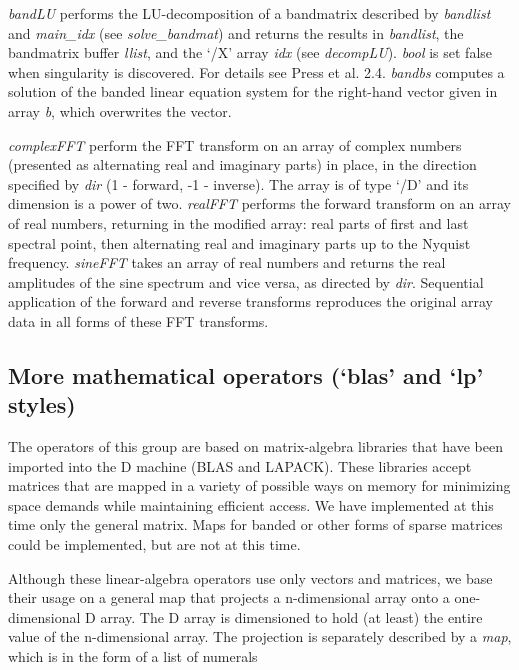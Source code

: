 \emph{bandLU} performs the LU-decomposition of a bandmatrix described by \emph{bandlist} and \emph{main\_idx} (see \emph{solve\_bandmat}) and returns the results in \emph{bandlist}, the bandmatrix buffer \emph{llist}, and the `/X' array \emph{idx} (see \emph{decompLU}). \emph{bool} is set false when singularity is discovered. For details see Press et al. 2.4. \emph{bandbs} computes a solution of the banded linear equation system for the right-hand vector given in array \emph{b}, which overwrites the vector.  

\emph{complexFFT} perform the FFT transform on an array of complex numbers (presented as alternating real and imaginary parts) in place, in the direction specified by \emph{dir} (1 - forward, -1 - inverse). The array is of type `/D' and its dimension is a power of two. \emph{realFFT} performs the forward transform on an array of real numbers, returning in the modified array: real parts of first and last spectral point, then alternating real and imaginary parts up to the Nyquist frequency. \emph{sineFFT} takes an array of real numbers and returns the real amplitudes of the sine spectrum and vice versa, as directed by \emph{dir}. Sequential application of the forward and reverse transforms reproduces the original array data in all forms of these FFT transforms.
   

       
\subsection{More mathematical operators (`blas' and `lp' styles)}

The operators of this group are based on matrix-algebra libraries that have been imported into the D machine (BLAS and LAPACK). These libraries accept matrices that are mapped in a variety of possible ways on memory for minimizing space demands while maintaining efficient access. We have implemented at this time only the general matrix. Maps for banded or other forms of sparse matrices could be implemented, but are not at this time. 

Although these linear-algebra operators use only vectors and matrices, we base their usage on a general map that projects a n-dimensional array onto a one-dimensional D array. The D array is dimensioned to hold (at least) the entire value of the n-dimensional array. The projection is separately described by a \emph{map}, which is in the form of a list of numerals\\


